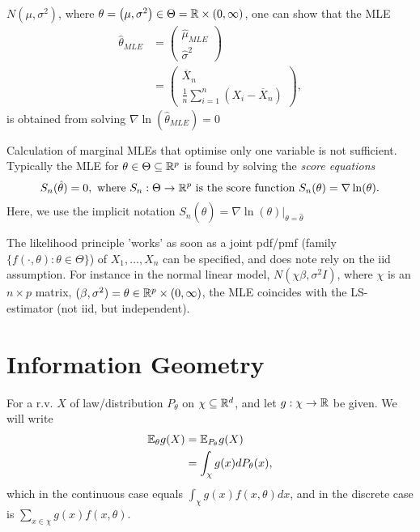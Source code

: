 \documentclass[a4paper]{article}
\begin{document}
\begin{eg}
	$N\left( \mu, \sigma^2 \right) $, where $\theta = \left( \mu, \sigma^2 \right) \in \Theta = \mathbb{R} \times (0, \infty)$, one can show that the MLE
	\begin{align*}
		\hat{\theta}_{MLE} &= \begin{pmatrix} \hat{\mu}_{MLE} \\ \hat{\sigma}^2\end{pmatrix} \\
		&= \begin{pmatrix} \overline{X}_{n} \\ \frac{1}{n} \sum_{i=1}^{n}\left( X_{i} - \overline{X}_{n} \right)  \end{pmatrix} 
	,\end{align*}
	is obtained from solving  $\nabla \ln(\hat{\theta}_{MLE}) = 0$
\end{eg}

\begin{remark}
	Calculation of marginal MLEs that optimise only one variable is not sufficient. Typically the MLE for $\theta \in \Theta \subseteq \mathbb{R}^{p}$ is found by solving the \textit{score equations}
	\[
		S_{n}( \hat{\theta}) = 0, \text{ where } S_{n} : \Theta \to  \mathbb{R}^{p} \text{ is the score function } S_{n} (\theta) = \nabla \ln(\theta)
	.\]
	Here, we use the implicit notation $S_{n}(\hat{\theta}) = \nabla \ln(\theta) |_{\theta = \hat{\theta}}$
\end{remark}

\begin{remark}
	The likelihood principle 'works' as soon as a joint pdf/pmf (family $\{f\left( \cdot , \theta \right) : \theta \in  \Theta\} $) of $X_{1}, \ldots, X_{n}$ can be specified, and does note rely on the iid assumption. For instance in the normal linear model, $N\left( \chi \beta, \sigma^2 I \right) $, where $\chi$ is an $n\times p$ matrix, $(\beta, \sigma^2) = \theta \in \mathbb{R}^{p} \times (0, \infty)$, the MLE coincides with the LS-estimator (not iid, but independent).
\end{remark}

\section{Information Geometry}

For a r.v. $X$ of law/distribution $P_{\theta}$ on $\chi \subseteq \mathbb{R}^{d}$, and let $g: \chi \to  \mathbb{R}$ be given. We will write
\begin{align*}
	\mathbb{E}_{\theta} g(X) &= \mathbb{E}_{P_{\theta}} g(X) \\
	&= \int_{\chi} g(x) dP_{\theta}(x)
,\end{align*}
which in the continuous case equals $\int_{\chi} g(x) f(x, \theta) dx$, and in the discrete case is $\sum_{x \in \chi}g(x) f(x, \theta)$.
\end{document}
